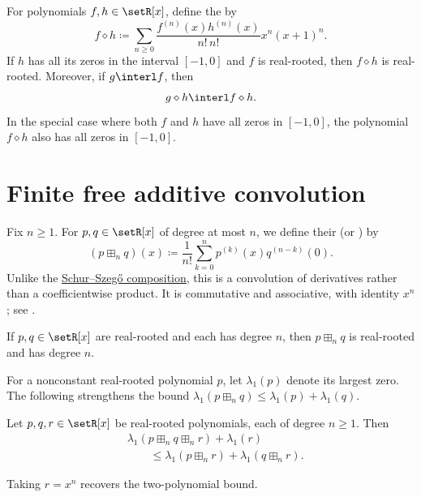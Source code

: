 \begin{theorem}
For polynomials $f,h\in \setR[x]$, define the
\label{diamondProductDefinition} by
\[
  f\diamond h
  \coloneqq
  \sum_{n\geq 0}
  \frac{f^{(n)}(x)h^{(n)}(x)}{n!\,n!}x^n(x+1)^n.
\]
If $h$ has all its zeros in the interval $[-1,0]$ and $f$ is
real-rooted, then $f\diamond h$ is real-rooted.  Moreover, if
$g \interl f$, then
\[
  g\diamond h \interl f\diamond h.
\]
In the special case where both $f$ and $h$ have all zeros in $[-1,0]$,
the polynomial $f\diamond h$ also has all zeros in $[-1,0]$.
\end{theorem}



\section[finiteFreeAdditiveConvolution]{Finite free additive convolution}

Fix $n\geq1$. For $p,q\in\setR[x]$ of degree at most $n$, we define their
\label{walshConvolutionDefinition}
(or ) by
\[
 (p\boxplus_n q)(x)\coloneqq
 \frac{1}{n!}\sum_{k=0}^n p^{(k)}(x)q^{(n-k)}(0).
\]
Unlike the \hyperref[schurSzegoComposition]{Schur--Szeg\H{o} composition},
this is a convolution of derivatives rather than a coefficientwise product.
It is commutative and associative, with identity $x^n$;
see \cite{LeakeRyder2018x,MarcusSpielmanSrivastava2022}.

\begin{theorem}
If $p,q\in\setR[x]$ are real-rooted and each has degree $n$, then
$p\boxplus_n q$ is real-rooted and has degree $n$.
\end{theorem}

For a nonconstant real-rooted polynomial $p$, let $\lambda_1(p)$ denote its
largest zero. The following  strengthens
the bound $\lambda_1(p\boxplus_n q)\leq\lambda_1(p)+\lambda_1(q)$.

\begin{theorem}
Let $p,q,r\in\setR[x]$ be real-rooted polynomials, each of degree $n\geq1$.
Then
\[
 \begin{aligned}
 &\lambda_1(p\boxplus_n q\boxplus_n r)+\lambda_1(r)\\
 &\qquad\leq
 \lambda_1(p\boxplus_n r)+\lambda_1(q\boxplus_n r).
 \end{aligned}
\]
\end{theorem}
Taking $r=x^n$ recovers the two-polynomial bound.


